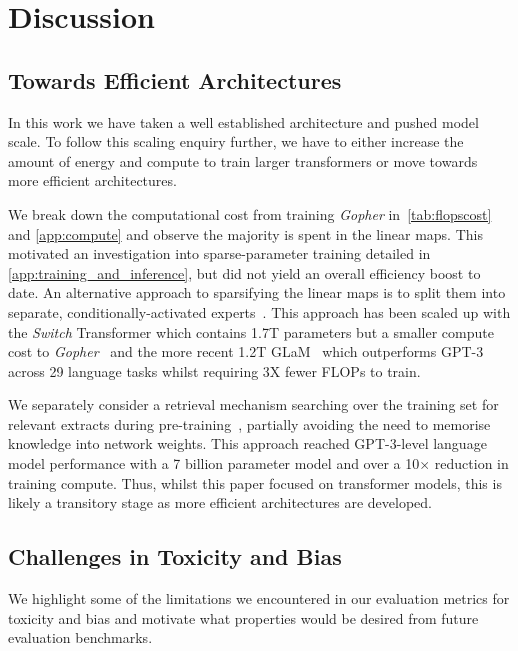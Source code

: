 \documentclass[11pt, a4paper, logo, internal, copyright, nonumbering]{deepmind}
\newcommand{\gopher}{\textit{Gopher}\xspace}
\begin{document}
\section{Discussion} 
\label{sec:discussion}

\subsection{Towards Efficient Architectures}
In this work we have taken a well established architecture and pushed model scale. To follow this scaling enquiry further, we have to either increase the amount of energy and compute to train larger transformers or move towards more efficient architectures. 

We break down the computational cost from training \gopher in~\autoref{tab:flopscost} and \autoref{app:compute} and observe the majority is spent in the linear maps. This motivated an investigation into sparse-parameter training detailed in \autoref{app:training_and_inference}, but did not yield an overall efficiency boost to date. An alternative approach to sparsifying the linear maps is to split them into separate, conditionally-activated experts~\citep{lepikhin2020gshard, fedus2021switch, lin2021m610t}. This approach has been scaled up with the \textit{Switch} Transformer which contains 1.7T parameters but a smaller compute cost to \gopher~\citep{fedus2021switch} and  the more recent 1.2T GLaM~\citep{du2021glam} which outperforms GPT-3 across 29 language tasks whilst requiring 3X fewer FLOPs to train. 

We separately consider a retrieval mechanism searching over the training set for relevant extracts during pre-training~\citep{borgeaud2021retrieval}, partially avoiding the need to memorise knowledge into network weights. This approach reached GPT-3-level language model performance with a 7 billion parameter model and over a 10$\times$ reduction in training compute. Thus, whilst this paper focused on transformer models, this is likely a transitory stage as more efficient architectures are developed.

\subsection{Challenges in Toxicity and Bias}
\label{tox-bias-limitations}

We highlight some of the limitations we encountered in our evaluation metrics for toxicity and bias and motivate what properties would be desired from future evaluation benchmarks.
\end{document}

